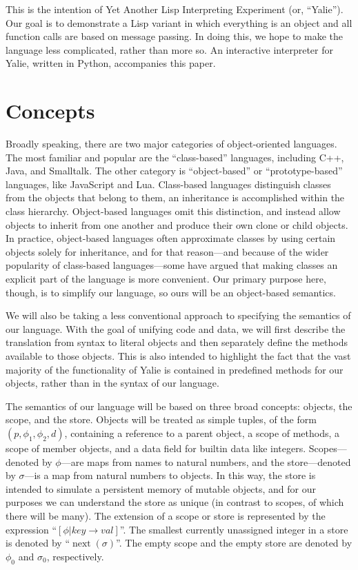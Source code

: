 \documentclass[twocolumn]{article}
\begin{document}
This is the intention of Yet Another Lisp Interpreting Experiment (or,
``Yalie''). Our goal is to demonstrate a Lisp variant in which
everything is an object and all function calls are based on message
passing. In doing this, we hope to make the language less complicated,
rather than more so. An interactive interpreter for Yalie, written in
Python, accompanies this paper.

\section*{Concepts}
Broadly speaking, there are two major categories of object-oriented
languages.\cite{Abadi} The most familiar and popular are the
``class-based'' languages, including C++, Java, and Smalltalk. The
other category is ``object-based'' or ``prototype-based'' languages,
like JavaScript and Lua. Class-based languages distinguish classes
from the objects that belong to them, an inheritance is accomplished
within the class hierarchy. Object-based languages omit this
distinction, and instead allow objects to inherit from one another and
produce their own clone or child objects. In practice, object-based
languages often approximate classes by using certain objects solely
for inheritance, and for that reason---and because of the wider
popularity of class-based languages---some have argued that making
classes an explicit part of the language is more
convenient.\cite{Bruce} Our primary purpose here, though, is to
simplify our language, so ours will be an object-based semantics.

We will also be taking a less conventional approach to specifying the
semantics of our language. With the goal of unifying code and data, we
will first describe the translation from syntax to literal objects and
then separately define the methods available to those objects. This is
also intended to highlight the fact that the vast majority of the
functionality of Yalie is contained in predefined methods for our
objects, rather than in the syntax of our language.

The semantics of our language will be based on three broad concepts:
objects, the scope, and the store. Objects will be treated as simple
tuples, of the form $(p,\phi_1,\phi_2,d)$, containing a reference to a
parent object, a scope of methods, a scope of member objects, and a
data field for builtin data like integers. Scopes---denoted by
$\phi$---are maps from names to natural numbers, and the
store---denoted by $\sigma$---is a map from natural numbers to
objects. In this way, the store is intended to simulate a persistent
memory of mutable objects, and for our purposes we can understand the
store as unique (in contrast to scopes, of which there will be
many). The extension of a scope or store is represented by the
expression ``$[\phi|key\rightarrow val]$''. The smallest currently
unassigned integer in a store is denoted by
``$\operatorname{next}(\sigma)$''. The empty scope and the empty store
are denoted by $\phi_0$ and $\sigma_0$, respectively.
\end{document}

